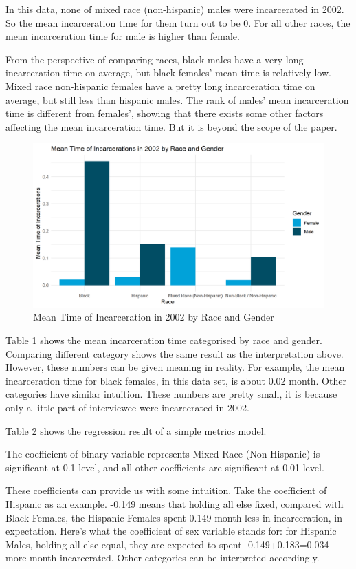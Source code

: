 \documentclass{article}
\begin{document}
In this data, none of mixed race (non-hispanic) males were incarcerated in 2002. So the mean incarceration time for them turn out to be 0. For all other races, the mean incarceration time for male is higher than female. 

From the perspective of comparing races, black males have a very long incarceration time on average, but black females' mean time is relatively low. Mixed race non-hispanic females have a pretty long incarceration time on average, but still less than hispanic males. The rank of males' mean incarceration time is different from females', showing that there exists some other factors affecting the mean incarceration time. But it is beyond the scope of the paper.


\begin{figure}[H]
    \begin{center}
        \includegraphics[width=.85\textwidth]{incarcerations_by_racegender}
    \end{center}
    \caption{Mean Time of Incarceration in 2002 by Race and Gender}
    \label{fig:graph}
\end{figure}


Table 1 shows the mean incarceration time categorised by race and gender. Comparing different category shows the same result as the interpretation above. However, these numbers can be given meaning in reality. For example, the mean incarceration time for black females, in this data set, is about 0.02 month. Other categories have similar intuition. These numbers are pretty small, it is because only a little part of interviewee were incarcerated in 2002. 



Table 2 shows the regression result of a simple metrics model. 

The coefficient of binary variable represents Mixed Race (Non-Hispanic) is significant at 0.1 level, and all other coefficients are significant at 0.01 level. 

These coefficients can provide us with some intuition. Take the coefficient of Hispanic as an example. -0.149 means that holding all else fixed, compared with Black Females, the Hispanic Females spent 0.149 month less in incarceration, in expectation. Here's what the coefficient of sex variable stands for: for Hispanic Males, holding all else equal, they are expected to spent -0.149+0.183=0.034 more month incarcerated. Other categories can be interpreted accordingly.


\end{document}
